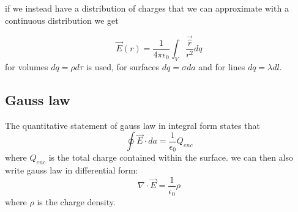 \documentclass[10pt, A4]{article}
\begin{document}
if we instead have a distribution of charges that we can approximate with a continuous distribution we get  

\begin{shaded}
\begin{equation}
\vec{E}(r) = \frac{1}{4\pi\epsilon_0} \int_V \frac{\vec{\hat{r}}}{r^2} dq
\end{equation}
for volumes $dq = \rho d\tau$ is used, for surfaces $dq = \sigma da$ and for lines $dq = \lambda dl$.
\end{shaded}

\subsection{Gauss law}

\begin{shaded}
The quantitative statement of gauss law in integral form states that 
\begin{equation}
\oint \vec{E} \cdot da = \frac{1}{\epsilon_0} Q_{enc}
\end{equation}
where $Q_{enc}$ is the total charge contained within the surface. we can then also write gauss law in differential form: 
\begin{equation}
\nabla \cdot \vec{E} = \frac{1}{\epsilon_0}\rho
\end{equation}
where $\rho$ is the charge density. 
\end{shaded}
\end{document}
